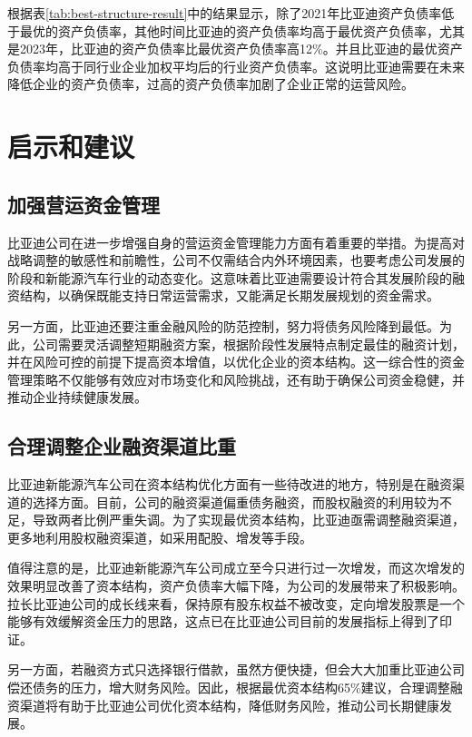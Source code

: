根据表\eqref{tab:best-structure-result}中的结果显示，除了2021年比亚迪资产负债率低于最优的资产负债率，其他时间比亚迪的资产负债率均高于最优资产负债率，尤其是2023年，比亚迪的资产负债率比最优资产负债率高12\%。并且比亚迪的最优资产负债率均高于同行业企业加权平均后的行业资产负债率。这说明比亚迪需要在未来降低企业的资产负债率，过高的资产负债率加剧了企业正常的运营风险。 
\section{启示和建议}
\subsection{加强营运资金管理}
比亚迪公司在进一步增强自身的营运资金管理能力方面有着重要的举措。为提高对战略调整的敏感性和前瞻性，公司不仅需结合内外环境因素，也要考虑公司发展的阶段和新能源汽车行业的动态变化。这意味着比亚迪需要设计符合其发展阶段的融资结构，以确保既能支持日常运营需求，又能满足长期发展规划的资金需求。

另一方面，比亚迪还要注重金融风险的防范控制，努力将债务风险降到最低。为此，公司需要灵活调整短期融资方案，根据阶段性发展特点制定最佳的融资计划，并在风险可控的前提下提高资本增值，以优化企业的资本结构。这一综合性的资金管理策略不仅能够有效应对市场变化和风险挑战，还有助于确保公司资金稳健，并推动企业持续健康发展。
\subsection{合理调整企业融资渠道比重}
比亚迪新能源汽车公司在资本结构优化方面有一些待改进的地方，特别是在融资渠道的选择方面。目前，公司的融资渠道偏重债务融资，而股权融资的利用较为不足，导致两者比例严重失调。为了实现最优资本结构，比亚迪亟需调整融资渠道，更多地利用股权融资渠道，如采用配股、增发等手段。

值得注意的是，比亚迪新能源汽车公司成立至今只进行过一次增发，而这次增发的效果明显改善了资本结构，资产负债率大幅下降，为公司的发展带来了积极影响。拉长比亚迪公司的成长线来看，保持原有股东权益不被改变，定向增发股票是一个能够有效缓解资金压力的思路，这点已在比亚迪公司目前的发展指标上得到了印证。

另一方面，若融资方式只选择银行借款，虽然方便快捷，但会大大加重比亚迪公司偿还债务的压力，增大财务风险。因此，根据最优资本结构65\%建议，合理调整融资渠道将有助于比亚迪公司优化资本结构，降低财务风险，推动公司长期健康发展。